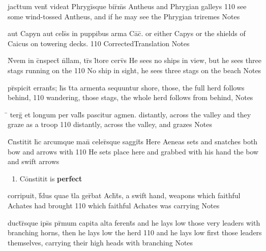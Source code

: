\latline
  {jact\={}tum vent\={} videat Phrygi\={}sque bir\={}m\={\macron {\i}}s}
  { Antheus and Phrygian galleys }
  {110}
  { see some wind-tossed Antheus, and if he may see the Phrygian triremes }
  { Notes }


\latline
  {aut Capyn aut cels\={\macron {\i}}s in puppibus arma Ca\={\macron {\i}}c\={\macron {\i}}.}
  { or either Capys or the shields of Caicus on towering decks. }
  {110}
  { CorrectedTranslation }
  { Notes }



\latline
  {N\={}vem in c\={}nspect\={} n\={}llam, tr\={\macron {\i}}s l\={\macron {\i}}tore cerv\={}s}
  { He sees no ships in view, but he sees three stags running on the  }
  {110}
  { No ship in sight, he sees three stags on the beach }
  { Notes }


\latline
  {pr\={}spicit errant\={\macron {\i}}s; h\={}s t\={}ta armenta sequuntur}
  { shore, those, the full herd follows behind, }
  {110}
  { wandering, those stags, the whole herd follows from behind,  }
  { Notes }


\latline
  {\={} terg\={} et longum per vall\={\macron {\i}}s pascitur agmen.}
  { distantly, across the valley and they graze as a troop }
  {110}
  { distantly, across the valley, and grazes }
  { Notes }



\latline
  {C\={}nstitit h\={\macron {\i}}c arcumque man\={} celer\={\macron {\i}}sque saggit\={}s}
  { Here Aeneas sets and snatches both bow and arrows with }
  {110}
  { He sets place here and grabbed with his hand the bow and swift arrows  }
  { \begin{enumerate}
  	\item C\={o}nstitit is \textbf{perfect}
  \end{enumerate} }


\latline
  {corripuit, f\={\macron {\i}}dus quae t\={}la ger\={}bat Ach\={}t\={}s,}
  { a swift hand, weapons which faithful Achates had brought  }
  {110}
  { which faithful Achates was carrying }
  { Notes }


\latline
  {duct\={}r\={}sque ips\={}s pr\={\macron {\i}}mum capita alta ferent\={\macron {\i}}s}
  { and he lays low those very leaders with branching horns, then he lays low the herd  }
  {110}
  { and he lays low first those leaders themselves, carrying their high heads with branching  }
  { Notes }



